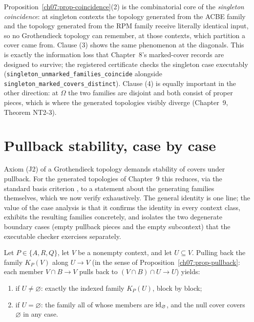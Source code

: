 \begin{remark}\label{ch07:rem-coincidence-forward}
Proposition~\ref{ch07:prop-coincidence}(2) is the combinatorial core of the \emph{singleton coincidence}: at singleton contexts the topology generated from the ACBE family and the topology generated from the RPM family receive literally identical input, so no Grothendieck topology can remember, at those contexts, which partition a cover came from. Clause (3) shows the same phenomenon at the diagonals. This is exactly the information loss that Chapter~8's marked-cover records are designed to survive; the registered certificate checks the singleton case executably (\texttt{singleton\_unmarked\_families\_coincide} alongside \texttt{singleton\_marked\_covers\_distinct}). Clause (4) is equally important in the other direction: at $\Omega$ the two families are disjoint and both consist of proper pieces, which is where the generated topologies visibly diverge (Chapter~9, Theorem NT2-3).
\end{remark}

\section{Pullback stability, case by case}\label{ch07:sec-pullback-stability}

Axiom (J2) of a Grothendieck topology demands stability of covers under pullback. For the generated topologies of Chapter~9 this reduces, via the standard basis criterion \cite{stacks00ZC}, to a statement about the generating families themselves, which we now verify exhaustively. The general identity is one line; the value of the case analysis is that it confirms the identity in every context class, exhibits the resulting families concretely, and isolates the two degenerate boundary cases (empty pullback pieces and the empty subcontext) that the executable checker exercises separately.

\begin{proposition}\label{ch07:prop-pullback-stability}
Let $P\in\{A,R,Q\}$, let $V$ be a nonempty context, and let $U\subseteq V$. Pulling back the family $K_{P}(V)$ along $U\to V$ (in the sense of Proposition~\ref{ch07:prop-pullback}: each member $V\cap B\to V$ pulls back to $(V\cap B)\cap U\to U$) yields:
\begin{enumerate}
\item if $U\neq\varnothing$: exactly the indexed family $K_{P}(U)$, block by block;
\item if $U=\varnothing$: the family all of whose members are $\mathrm{id}_{\varnothing}$, and the null cover covers $\varnothing$ in any case.
\end{enumerate}
\end{proposition}

